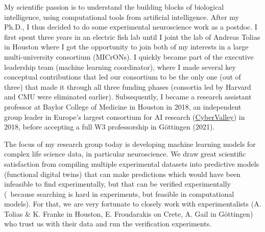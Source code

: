 \documentclass[COG,11pt]{ercgrant}
\begin{document}
My scientific passion is to understand the building blocks of biological intelligence, using computational tools from artificial intelligence. After my Ph.D., I thus decided to do some experimental neuroscience work as a postdoc. I first spent three years in an electric fish lab until I joint the lab of Andreas Tolias in Houston where I got the opportunity to join both of my interests in a large multi-university consortium (MICrONs). I quickly became part of the executive leadership team (machine learning coordinator), where I made several key conceptual contributions that led our consortium to be the only one (out of three) that made it through all three funding phases (consortia led by Harvard and CMU were eliminated earlier). Subsequently, I became a research assistant professor at Baylor College of Medicine in Houston in 2018, an independent group leader in Europe's largest consortium for AI research  (\href{https://cyber-valley.de/}{CyberValley}) in 2018, before accepting a full W3 professorship in Göttingen (2021).

The focus of my research group today is developing machine learning models for complex life science data, in particular neuroscience. We draw great scientific satisfaction from compiling multiple experimental datasets into predictive models (functional digital twins) that can make predictions which would have been infeasible to find experimentally, but that can be verified experimentally (\eg~because searching is hard in experiments, but feasible in computational models). For that, we are very fortunate to closely work with experimentalists (A. Tolias \& K. Franke in Houston, E. Froudarakis on Crete, A. Gail in Göttingen) who trust us with their data and run the verification experiments.
\end{document}
